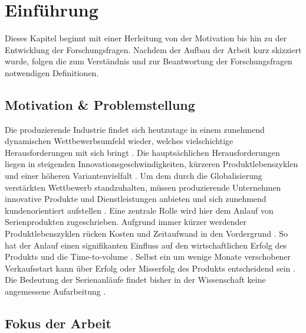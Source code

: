\chapter{Einführung}\label{sec:einfuehrung}
Dieses Kapitel beginnt mit einer Herleitung von der Motivation bis hin zu der Entwicklung der Forschungsfragen. Nachdem der Aufbau der Arbeit kurz skizziert wurde, folgen die zum Verständnis und zur Beantwortung der Forschungsfragen notwendigen Definitionen. 

\section{Motivation \& Problemstellung}
Die produzierende Industrie findet sich heutzutage in einem zunehmend dynamischen Wettbewerbsumfeld wieder, welches vielschichtige Herausforderungen mit sich bringt \autocite{Renner2012}. Die hauptsächlichen Herausforderungen liegen in steigenden Innovationsgeschwindigkeiten, kürzeren Produktlebenszyklen und einer höheren Variantenvielfalt \autocite{Kuhn2002,Stauder2016}. Um dem durch die Globalisierung verstärkten Wettbewerb standzuhalten, müssen produzierende Unternehmen innovative Produkte und Dienstleistungen anbieten und sich zunehmend kundenorientiert aufstellen \autocite{Surbier2014}. 
Eine zentrale Rolle wird hier dem Anlauf von Serienprodukten zugeschrieben. Aufgrund immer kürzer werdender Produktlebenszyklen rücken Kosten und Zeitaufwand in den Vordergrund \autocite{Winkler2007}. So hat der Anlauf einen signifikanten Einfluss auf den wirtschaftlichen Erfolg des Produkts und die Time-to-volume \autocite{Klocke16}. Selbst ein um wenige Monate verschobener Verkaufsstart kann über Erfolg oder Misserfolg des Produkts entscheidend sein \autocite{Schuh2008a}. Die Bedeutung der Serienanläufe findet bisher in der Wissenschaft keine angemessene Aufarbeitung \autocite{Dyckhoff2012}. 

\section{Fokus der Arbeit}

